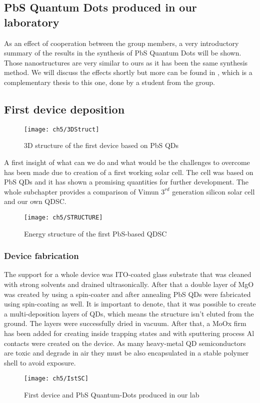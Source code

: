 \subsection{PbS Quantum Dots produced in our laboratory}
As an effect of cooperation between the group members, a very introductory summary of the results in the synthesis of PbS Quantum Dots will be shown. Those nanostructures are very similar to ours as it has been the same synthesis method. We will discuss the effects shortly but more can be found in \cite{swietek}, which is a complementary thesis to this one, done by a student from the group. 


\subsection{First device deposition}
\begin{figure}[t]
\center
\texttt{[image: ch5/3DStruct]}
\caption{3D structure of the first device based on PbS QDs}
\label{fig:1stStructure}
\end{figure}
A first insight of what can we do and what would be the challenges to overcome has been made due to creation of a first working solar cell. The cell was based on PbS QDs and it has shown a promising quantities for further development. The whole subchapter provides a comparison of Vimun $3^{rd}$ generation silicon solar cell and our own QDSC.
\begin{figure}[H]
\center
\texttt{[image: ch5/STRUCTURE]}
\caption{Energy structure of the first PbS-based QDSC}
\label{fig:1stEnergy}
\end{figure}

\subsubsection{Device fabrication}
\noindent The support for a whole device was ITO-coated glass substrate that was cleaned with strong solvents and drained ultrasonically. After that a double layer of MgO was created by using a spin-coater and after annealing PbS QDs were fabricated using spin-coating as well. It is important to denote, that it was possible to create a multi-deposition layers of QDs, which means the structure isn’t eluted from the ground. The layers were successfully dried in vacuum. After that, a MoOx firm has been added for creating inside trapping states and 
with sputtering process Al contacts were created on the device. As many heavy-metal QD semiconductors are toxic and degrade in air they must be also encapsulated in a stable polymer shell to avoid exposure. 
\begin{figure}
\center
\texttt{[image: ch5/IstSC]}
\caption{First device and PbS Quantum-Dots produced in our lab}
\end{figure}

